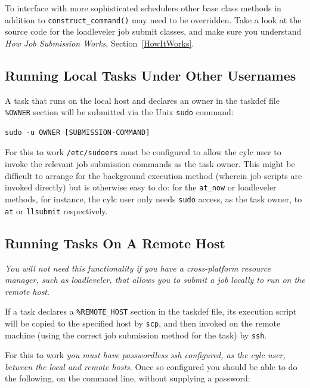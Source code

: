 \documentclass[11pt,a4paper]{article}
\begin{document}
To interface with more sophisticated schedulers other base class methods
in addition to \lstinline=construct_command()= may need to be overridden.
Take a look at the source code for the loadleveler job submit classes,
and make sure you understand {\em How Job Submission Works},
Section~\ref{HowItWorks}.

\subsection{Running Local Tasks Under Other Usernames}
\label{RunningLocalTasksUnderOtherUsernames}

\lstset{language=cylctaskdef}

A task that runs on the local host and declares an owner in the taskdef
file \lstinline=%OWNER= section will be submitted via the Unix
\lstinline=sudo= command:  

\lstset{language=bash}

\begin{lstlisting}
sudo -u OWNER [SUBMISSION-COMMAND]
\end{lstlisting}

For this to work \lstinline=/etc/sudoers= must be configured to allow
the cylc user to invoke the relevant job submission commands as the task
owner.  This might be difficult to arrange for the background execution
method (wherein job scripts are invoked directly) but is
otherwise easy to do: for the \lstinline=at_now= or loadleveler methods,
for instance, the cylc user only needs \lstinline=sudo= access, as the
task owner, to \lstinline=at= or \lstinline=llsubmit= respectively.

\subsection{Running Tasks On A Remote Host}
\label{RunningTasksOnARemoteHost}

{\em You will not need this functionality if you have a cross-platform
resource manager, such as loadleveler, that allows you to submit a job
locally to run on the remote host}.

If a task declares a \lstinline=%REMOTE_HOST= section in the taskdef
file, its execution script will be copied to the specified host by 
\lstinline=scp=, and then invoked on the remote machine (using the
correct job submission method for the task) by \lstinline=ssh=. 

For this to work {\em you must have passwordless ssh configured, as 
the cylc user, between the local and remote hosts}. Once so configured
you should be able to do the following, on the command line, without
supplying a password:
\end{document}
